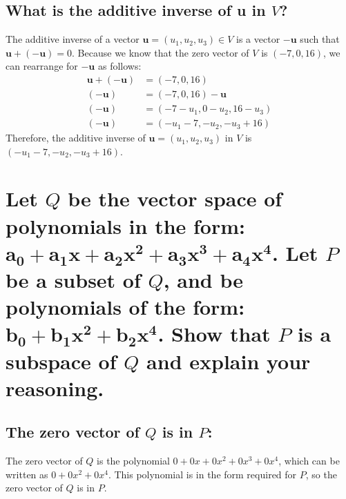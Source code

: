 \documentclass[
  letterpaper,
  DIV=11,
  numbers=noendperiod]{scrartcl}
\begin{document}
\subsection{\texorpdfstring{What is the additive inverse of \textbf{u}
in
\(V\)?}{What is the additive inverse of u in V?}}\label{what-is-the-additive-inverse-of-u-in-v}

The additive inverse of a vector \(\mathbf{u} = (u_1, u_2, u_3) \in V\)
is a vector \(-\mathbf{u}\) such that
\(\mathbf{u} + (-\mathbf{u}) = 0\). Because we know that the zero vector
of \(V\) is \((-7, 0, 16)\), we can rearrange for \(-\mathbf{u}\) as
follows: \begin{align*}
\mathbf{u} + (-\mathbf{u}) &= (-7, 0, 16) \\
(-\mathbf{u}) &= (-7, 0, 16) - \mathbf{u} \\
(-\mathbf{u}) &= (-7-u_1, 0-u_2, 16-u_3) \\
(-\mathbf{u}) &= (-u_1-7, -u_2, -u_3+16)
\end{align*} Therefore, the additive inverse of
\(\mathbf{u} = (u_1, u_2, u_3)\) in \(V\) is
\((-u_1-7, -u_2, -u_3+16)\).

\newpage{}

\section{\texorpdfstring{Let \(Q\) be the vector space of polynomials in
the form: \(\mathbf{a_0+a_1x+a_2x^2+a_3x^3+a_4x^4}\). Let \(P\) be a
subset of \(Q\), and be polynomials of the form:
\(\mathbf{b_0+b_1x^2+b_2x^4}\). \textbf{Show that \(P\) is a subspace of
\(Q\) and explain your
reasoning.}}{Let Q be the vector space of polynomials in the form: \textbackslash mathbf\{a\_0+a\_1x+a\_2x\^{}2+a\_3x\^{}3+a\_4x\^{}4\}. Let P be a subset of Q, and be polynomials of the form: \textbackslash mathbf\{b\_0+b\_1x\^{}2+b\_2x\^{}4\}. Show that P is a subspace of Q and explain your reasoning.}}\label{let-q-be-the-vector-space-of-polynomials-in-the-form-mathbfa_0a_1xa_2x2a_3x3a_4x4.-let-p-be-a-subset-of-q-and-be-polynomials-of-the-form-mathbfb_0b_1x2b_2x4.-show-that-p-is-a-subspace-of-q-and-explain-your-reasoning.}

\subsection{\texorpdfstring{The zero vector of \(Q\) is in
\(P\):}{The zero vector of Q is in P:}}\label{the-zero-vector-of-q-is-in-p}

The zero vector of \(Q\) is the polynomial
\(0 + 0x + 0x^2 + 0x^3 + 0x^4\), which can be written as
\(0 + 0x^2 + 0x^4\). This polynomial is in the form required for \(P\),
so the zero vector of \(Q\) is in \(P\).
\end{document}
